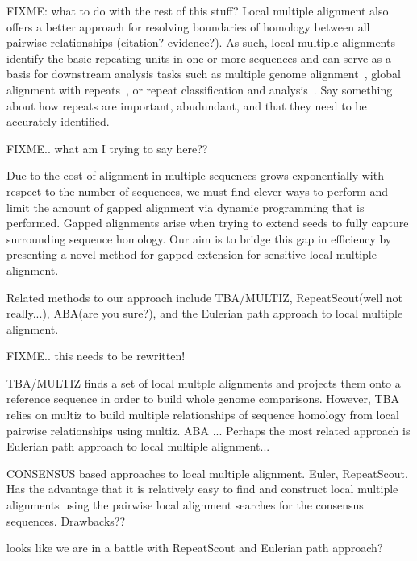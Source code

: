 \documentclass{llncs}
\begin{document}
FIXME: what to do with the rest of this stuff?
Local multiple alignment also offers a better approach for resolving boundaries of homology between all pairwise relationships (citation?  evidence?).  As such, local multiple alignments identify the basic repeating units in one or
more sequences and can serve as a basis for downstream analysis
tasks such as multiple genome alignment~\cite{ref-mauve,ref-mga,ref-mgcat,ref-deweyReview}, global
alignment with repeats~\cite{ref-otherSammethPaper,ref-aba}, or
repeat classification and analysis~\cite{ref-piler}. Say something about how repeats are important, abudundant, and that they need to be accurately identified.

FIXME.. what am I trying to say here??

Due to the cost of alignment in multiple sequences grows exponentially with respect to the number of sequences, we must find clever ways to perform and limit the amount of gapped alignment via dynamic programming that is performed. Gapped alignments arise when trying to extend seeds to fully capture surrounding sequence homology. Our aim is to bridge this gap in efficiency by presenting a novel method for gapped extension for sensitive local multiple alignment.


Related methods to our approach include TBA/MULTIZ, RepeatScout(well not really...), ABA(are you sure?),  and the Eulerian path approach to local multiple alignment.

FIXME.. this needs to be rewritten!

TBA/MULTIZ finds a set of local multple alignments and projects them onto a reference sequence in order to build whole genome comparisons. However, TBA relies on multiz to build multiple relationships of sequence homology from local pairwise relationships using multiz. ABA ... Perhaps the most related approach is Eulerian path approach to local multiple alignment...

CONSENSUS based approaches to local multiple alignment. Euler, RepeatScout. Has the advantage that it is relatively easy to find and construct local multiple alignments using the pairwise local alignment searches for the consensus sequences. Drawbacks??

looks like we are in a battle with RepeatScout and Eulerian path approach?

%



\label{sec:overview}
\end{document}
